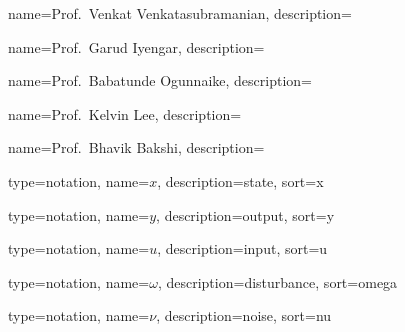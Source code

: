 	{
		name={Prof.~Venkat Venkatasubramanian},
		description={}
	}

	{
		name={Prof.~Garud Iyengar},
		description={}
	}
	
	{
		name={Prof.~Babatunde Ogunnaike},
		description={}
	}

	{
		name={Prof.~Kelvin Lee},
		description={}
	}

	{
		name={Prof.~Bhavik Bakshi},
		description={}
	}







  {
    type=notation,
	name={\ensuremath{x}},
    description={state},
    sort={x}
  }
  
  {
    type=notation,
	name={\ensuremath{y}},
    description={output},
    sort={y}
  }  

  {
    type=notation,
	name={\ensuremath{u}},
    description={input},
    sort={u}
  }

  {
    type=notation,
	name={\ensuremath{\omega}},
    description={disturbance},
    sort={omega}
  }

  {
    type=notation,
	name={\ensuremath{\nu}},
    description={noise},
    sort={nu}
  }  